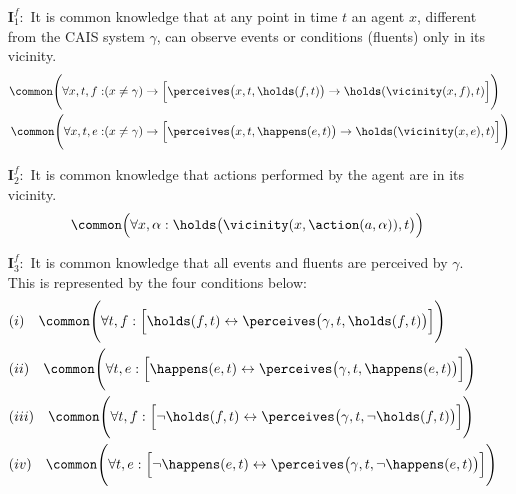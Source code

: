 \begin{mdframed}[frametitle= Formal Requirements for $\mathcal{I}$ ,
  nobreak,
  linecolor=white,
  ]
  \begin{enumerate}
  \item[$\mathbf{I}^f_1:$] It is common knowledge that at any
    point in time $t$ an agent $x$, different from the CAIS system
    $\gamma$, can observe events or conditions (fluents) only in
    its vicinity.
    \begin{equation*}
      \begin{aligned}
        \common\Bigg(\forall x, t, f:& (x \not = \gamma) \rightarrow \Big[\perceives\big(x, t, \holds(f, t)\big) \rightarrow
        \holds(\vicinity(x, f), t)\Big]\Bigg)\\
        \common\Bigg(\forall x, t, e:& (x \not = \gamma) \rightarrow \Big[\perceives\big(x, t, \happens(e, t)\big) \rightarrow
        \holds(\vicinity(x, e), t)\Big]\Bigg)\\
      \end{aligned}
    \end{equation*}

  \item[$\mathbf{I}^f_2:$] It is common knowledge that actions
    performed by the agent are in its vicinity.
    \begin{equation*}
      \common\Big(\forall x, \alpha:  \holds\big(\vicinity(x, \action(a, \alpha)), t\big)\Big)
    \end{equation*}
  \item[$\mathbf{I}^f_3:$] It is common knowledge that all events
    and fluents are perceived by $\gamma$.  This is represented by
    the four conditions below:
    \begin{equation*}
      \begin{aligned}
   &  (i) \hspace{10pt}  \common\Bigg(\forall  t, f:  \Big[\holds(f, t) \leftrightarrow \perceives\big(\gamma, t, \holds(f, t)\big) \Big]\Bigg)\\
   & (ii)  \hspace{10pt}   \common\Bigg(\forall  t, e: \Big[\happens(e, t)
        \leftrightarrow \perceives\big(\gamma, t, \happens(e,
        t)\big) \Big]\Bigg)\\
    &   (iii)  \hspace{10pt}   \common\Bigg(\forall  t, f:  \Big[\lnot \holds(f, t)
        \leftrightarrow \perceives\big(\gamma, t, \lnot \holds(f, t)\big) \Big]\Bigg)\\
    &   (iv) \hspace{10pt}    \common\Bigg(\forall  t, e:\Big[\lnot \happens(e, t)
        \leftrightarrow \perceives\big(\gamma, t, \lnot \happens(e, t)\big) \Big]\Bigg)
      \end{aligned}
    \end{equation*}
  \end{enumerate}
\end{mdframed}

